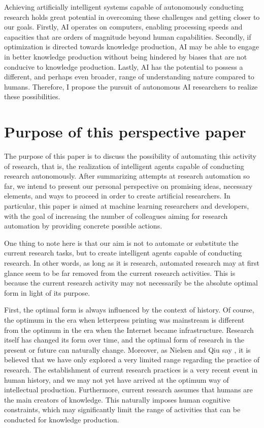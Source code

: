 \documentclass{book}
\begin{document}
Achieving artificially intelligent systems capable of autonomously conducting research holds great potential in overcoming these challenges and getting closer to our goals. Firstly, AI operates on computers, enabling processing speeds and capacities that are orders of magnitude beyond human capabilities. Secondly, if optimization is directed towards knowledge production, AI may be able to engage in better knowledge production without being hindered by biases that are not conducive to knowledge production. Lastly, AI has the potential to possess a different, and perhaps even broader, range of understanding nature compared to humans. Therefore, I propose the pursuit of autonomous AI researchers to realize these possibilities.

\section{Purpose of this perspective paper}

The purpose of this paper is to discuss the possibility of automating this activity of research, that is, the realization of intelligent agents capable of conducting research autonomously. After summarizing attempts at research automation so far, we intend to present our personal perspective on promising ideas, necessary elements, and ways to proceed in order to create artificial researchers. In particular, this paper is aimed at machine learning researchers and developers, with the goal of increasing the number of colleagues aiming for research automation by providing concrete possible actions.

One thing to note here is that our aim is not to automate or substitute the current research tasks, but to create intelligent agents capable of conducting research. In other words, as long as it is research, automated research may at first glance seem to be far removed from the current research activities. This is because the current research activity may not necessarily be the absolute optimal form in light of its purpose. 

First, the optimal form is always influenced by the context of history. Of course, the optimum in the era when letterpress printing was mainstream is different from the optimum in the era when the Internet became infrastructure. Research itself has changed its form over time, and the optimal form of research in the present or future can naturally change. Moreover, as Nielsen and Qiu say \cite{nielsen}, it is believed that we have only explored a very limited range regarding the practice of research. The establishment of current research practices is a very recent event in human history, and we may not yet have arrived at the optimum way of intellectual production. Furthermore, current research assumes that humans are the main creators of knowledge. This naturally imposes human cognitive constraints, which may significantly limit the range of activities that can be conducted for knowledge production. 
\end{document}
